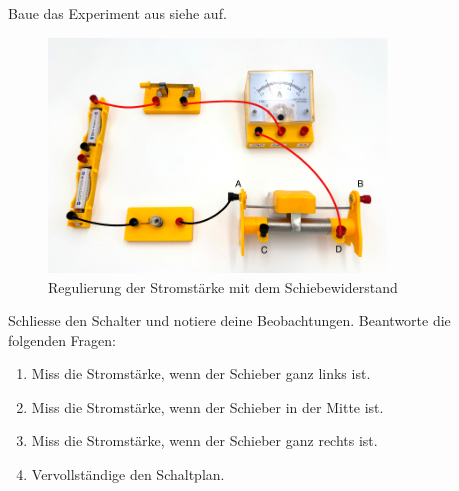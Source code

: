 \newpage
{}

Baue das Experiment aus siehe  auf.

\begin{figure}[h!]
    \centering
    \includegraphics[width=9cm]{_images/ohm_schiebewiderstand.pdf}
    \caption{Regulierung der Stromstärke mit dem Schiebewiderstand}
    \label{fig:potentiometer_series}
\end{figure}

Schliesse den Schalter und notiere deine Beobachtungen. Beantworte die folgenden Fragen:

\begin{enumerate}
    \item Miss die Stromstärke, wenn der Schieber ganz links ist.
    \item Miss die Stromstärke, wenn der Schieber in der Mitte ist.
    \item Miss die Stromstärke, wenn der Schieber ganz rechts ist.
    \item Vervollständige den Schaltplan.
\end{enumerate}


